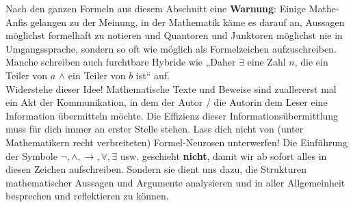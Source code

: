 \begin{bem}
Nach den ganzen Formeln aus diesem Abschnitt eine \textbf{Warnung}: Einige Mathe-Anfis gelangen zu der Meinung, in der Mathematik käme es darauf an, Aussagen möglichst formelhaft zu notieren und Quantoren und Junktoren möglichst nie in Umgangssprache, sondern so oft wie möglich als Formelzeichen aufzuschreiben. Manche schreiben auch furchtbare Hybride wie „Daher $\exists$ eine Zahl $n$, die ein Teiler von $a$ $\land$ ein Teiler von $b$ ist“ auf. \\
 Widerstehe dieser Idee! Mathematische Texte und Beweise sind zuallererst mal ein Akt der Kommunikation, in dem der Autor / die Autorin dem Leser eine Information übermitteln möchte. Die Effizienz dieser Informationsübermittlung muss für dich immer an erster Stelle stehen. Lass dich nicht von (unter Mathematikern recht verbreiteten) Formel-Neurosen unterwerfen! Die Einführung der Symbole $\neg,\land,\to,\forall,\exists$ usw. geschieht \textbf{nicht}, damit wir ab sofort alles in diesen Zeichen aufschreiben. Sondern sie dient uns dazu, die Strukturen mathematischer Aussagen und Argumente analysieren und in aller Allgemeinheit besprechen und reflektieren zu können.
\end{bem}



